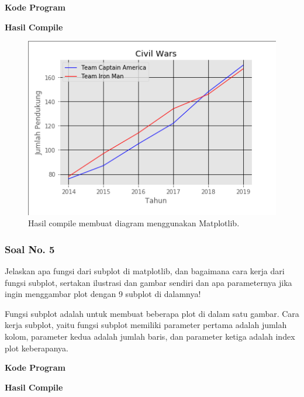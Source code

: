 \hfill \break
\textbf{Kode Program}



\hfill \break
\textbf{Hasil Compile}

\begin{figure}[H]
	\includegraphics[width=12cm]{figures/6/1174089/Praktek/4.png}
	\centering
	\caption{Hasil compile membuat diagram menggunakan Matplotlib.}
\end{figure}

\subsubsection{Soal No. 5}
\hfill \break
Jelaskan apa fungsi dari subplot di matplotlib, dan bagaimana cara kerja dari fungsi subplot, sertakan ilustrasi dan gambar sendiri dan apa parameternya jika ingin menggambar plot dengan 9 subplot di dalamnya!

\hfill \break
Fungsi subplot adalah untuk membuat beberapa plot di dalam satu gambar.
\hfill \break
Cara kerja subplot, yaitu fungsi subplot memiliki parameter pertama adalah jumlah kolom, parameter kedua adalah jumlah baris, dan parameter ketiga adalah index plot keberapanya.

\hfill \break
\textbf{Kode Program}



\hfill \break
\textbf{Hasil Compile}

